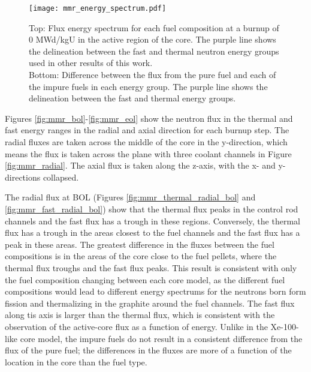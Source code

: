 \begin{figure}
        \centering
        \texttt{[image: mmr\_energy\_spectrum.pdf]}
        \caption{Top: Flux energy spectrum for each fuel composition at a 
        burnup of 0 MWd/kgU in the active region of the core. The 
        purple line shows the delineation between the fast and thermal 
        neutron energy groups used in other results of this work. \\
        Bottom: Difference between the flux from the pure fuel and each 
        of the impure fuels in each energy group. The purple line shows the 
        delineation between the fast and thermal energy groups. }
        \label{fig:mmr_energy_spectrum}
\end{figure}

Figures \ref{fig:mmr_bol}-\ref{fig:mmr_eol} show the neutron flux 
in the thermal and fast energy ranges in the radial and axial 
direction for each burnup step. The radial fluxes are taken 
across the middle of the core in the y-direction, which means the flux 
is taken across the plane with three coolant channels in Figure 
\ref{fig:mmr_radial}. The axial flux is taken along the z-axis, with the 
x- and y-directions collapsed. 

The radial flux at \gls{BOL} (Figures \ref{fig:mmr_thermal_radial_bol} and 
\ref{fig:mmr_fast_radial_bol}) show that the thermal flux peaks in the 
control rod channels and the fast flux has a trough in these regions. 
Conversely, the thermal flux has a trough in the areas closest to the fuel 
channels and the fast flux has a peak in these areas.
The greatest difference in the 
fluxes between the fuel compositions is in the areas of the core close 
to the fuel pellets, where the thermal flux troughs and the fast flux 
peaks. This result is consistent with only the fuel 
composition changing between each core model, as the different fuel 
compositions would lead to different energy spectrums for the neutrons 
born form fission and thermalizing in the graphite around the fuel channels.
The fast flux along tis axis is larger than the thermal flux, which is 
consistent with the observation of the active-core flux as a function of 
energy. Unlike in the Xe-100-like core model, the impure fuels do not 
result in a consistent difference from the flux of the pure fuel; the 
differences in the fluxes are more of a function of the location 
in the core than the fuel type.

